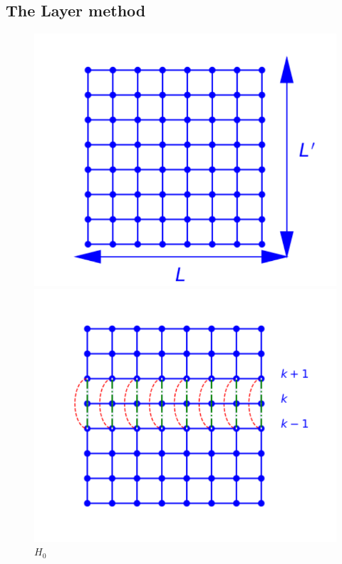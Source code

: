 \subsection{The Layer method}

\begin{figure}
\begin{minipage}[t]{0.32\linewidth}
\includegraphics[width=\linewidth]{numerical/cross-h0.pdf}
\caption*{$H_0$}
\end{minipage}
\begin{minipage}[t]{0.32\linewidth}
\includegraphics[width=\linewidth]{numerical/cross-hlambda.pdf}

\end{minipage}
\end{figure}
